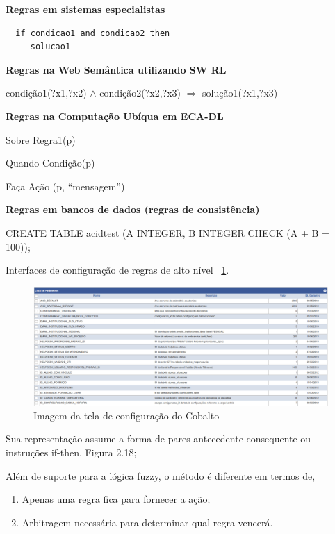\documentclass[12pt,a4paper,compsoc]{IEEEtran}
\begin{document}
  \textbf{Regras em sistemas especialistas}

  \begin{lstlisting}
  if condicao1 and condicao2 then
     solucao1
  \end{lstlisting}
  
  \textbf{Regras na Web Semântica utilizando SW RL}
  
  condição1(?x1,?x2) $\wedge$ condição2(?x2,?x3) $\Rightarrow$ solução1(?x1,?x3)

  \textbf{Regras na Computação Ubíqua em ECA-DL}

  Sobre Regra1(p)
  
  Quando Condição(p)
  
  Faça Ação (p, ``mensagem'')


  \textbf{Regras em bancos de dados (regras de consistência)}
  
  CREATE TABLE acidtest (A INTEGER, B INTEGER CHECK (A + B = 100));
  
  Interfaces de configuração de regras de alto nível  ~\ref{config-cobalto}.

  \begin{figure}[ht]
    \centerline{\includegraphics[scale=.35]{imagens/config-cobalto}}
    \caption{Imagem da tela de configuração do Cobalto}
    \label{config-cobalto}
  \end{figure}

  Sua representação assume a forma de pares antecedente-consequente ou instruções if-then, Figura
  2.18;
  
  Além de suporte para a lógica fuzzy, o método é diferente em termos de,
  
  \begin{enumerate}
    \item Apenas uma regra fica para fornecer a ação;
    \item Arbitragem necessária para determinar qual regra vencerá.
  \end{enumerate}
  
\end{document}
